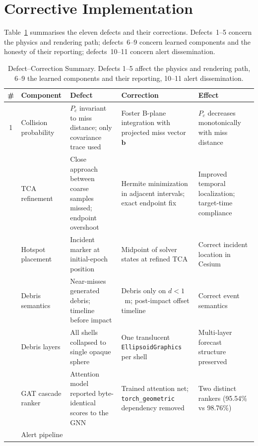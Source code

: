 \documentclass[conference]{IEEEtran}
\newcommand{\bvec}[1]{\mathbf{#1}}
\newcommand{\Pc}{P_c}
\begin{document}
\section{Corrective Implementation}
\label{sec:corrections}

Table~\ref{tab:defects} summarises the eleven defects and their corrections.
Defects~1--5 concern the physics and rendering path; defects~6--9 concern learned
components and the honesty of their reporting; defects~10--11 concern alert
dissemination.

\begin{table}[t]
\caption{Defect--Correction Summary. Defects 1--5 affect the physics and
rendering path, 6--9 the learned components and their reporting, 10--11 alert
dissemination.}
\label{tab:defects}
\centering
\footnotesize
\begin{tabular}{@{}clp{3.1cm}p{3.4cm}p{3.1cm}@{}}
\toprule
\textbf{\#} & \textbf{Component} & \textbf{Defect} & \textbf{Correction} & \textbf{Effect} \\
\midrule
1 & Collision probability
  & $\Pc$ invariant to miss distance; only covariance trace used
  & Foster B-plane integration with projected miss vector $\bvec{b}$
  & $\Pc$ decreases monotonically with miss distance \\
\addlinespace
2 & TCA refinement
  & Close approach between coarse samples missed; endpoint overshoot
  & Hermite minimization in adjacent intervals; exact endpoint fix
  & Improved temporal localization; target-time compliance \\
\addlinespace
3 & Hotspot placement
  & Incident marker at initial-epoch position
  & Midpoint of solver states at refined TCA
  & Correct incident location in Cesium \\
\addlinespace
4 & Debris semantics
  & Near-misses generated debris; timeline before impact
  & Debris only on $d < 1$~m; post-impact offset timeline
  & Correct event semantics \\
\addlinespace
5 & Debris layers
  & All shells collapsed to single opaque sphere
  & One translucent \texttt{EllipsoidGraphics} per shell
  & Multi-layer forecast structure preserved \\
\addlinespace
6 & GAT cascade ranker
  & Attention model reported byte-identical scores to the GNN
  & Trained attention net; \texttt{torch\_geometric} dependency removed
  & Two distinct rankers (95.54\% vs 98.76\%) \\
\addlinespace
7 & Alert pipeline

\end{tabular}
\end{table}
\end{document}
